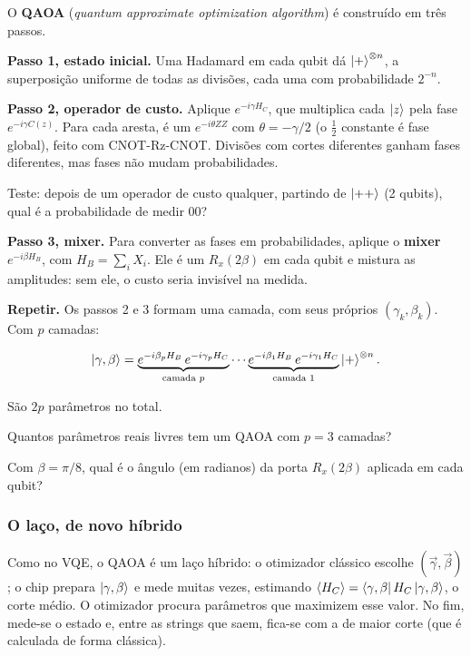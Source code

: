 O \textbf{QAOA} (\emph{quantum approximate optimization algorithm}) é construído em três passos.

\textbf{Passo 1, estado inicial.} Uma Hadamard em cada qubit dá \(\left|{+}\right>^{\otimes n}\), a superposição uniforme de todas as divisões, cada uma com probabilidade \(2^{-n}\).

\textbf{Passo 2, operador de custo.} Aplique \(e^{-i\gamma H_C}\), que multiplica cada \(\left|{z}\right>\) pela fase \(e^{-i\gamma C(z)}\). Para cada aresta, é um \(e^{-i\theta ZZ}\) com \(\theta = -\gamma/2\) (o \(\tfrac12\) constante é fase global), feito com CNOT-Rz-CNOT. Divisões com cortes diferentes ganham fases diferentes, mas fases não mudam probabilidades.

Teste: depois de um operador de custo qualquer, partindo de \(\left|{++}\right>\) (2 qubits), qual é a probabilidade de medir \(00\)?

\textbf{Passo 3, mixer.} Para converter as fases em probabilidades, aplique o \textbf{mixer} \(e^{-i\beta H_B}\), com \(H_B = \sum_i X_i\). Ele é um \(R_x(2\beta)\) em cada qubit e mistura as amplitudes: sem ele, o custo seria invisível na medida.

\textbf{Repetir.} Os passos 2 e 3 formam uma camada, com seus próprios \((\gamma_k,\beta_k)\). Com \(p\) camadas:

\[
\left|{\gamma,\beta}\right> = \underbrace{e^{-i\beta_p H_B}\, e^{-i\gamma_p H_C}}_{\text{camada } p}\cdots \underbrace{e^{-i\beta_1 H_B}\, e^{-i\gamma_1 H_C}}_{\text{camada } 1}\left|{+}\right>^{\otimes n}.
\]

São \(2p\) parâmetros no total.

Quantos parâmetros reais livres tem um QAOA com \(p = 3\) camadas?

Com \(\beta = \pi/8\), qual é o ângulo (em radianos) da porta \(R_x(2\beta)\) aplicada em cada qubit?

\subsubsection{O laço, de novo híbrido}\label{o-lauxe7o-de-novo-huxedbrido}

Como no VQE, o QAOA é um laço híbrido: o otimizador clássico escolhe \((\vec\gamma,\vec\beta)\); o chip prepara \(\left|{\gamma,\beta}\right>\) e mede muitas vezes, estimando \(\langle H_C\rangle = \left<{\gamma,\beta}\right|H_C\left|{\gamma,\beta}\right>\), o corte médio. O otimizador procura parâmetros que maximizem esse valor. No fim, mede-se o estado e, entre as strings que saem, fica-se com a de maior corte (que é calculada de forma clássica).

